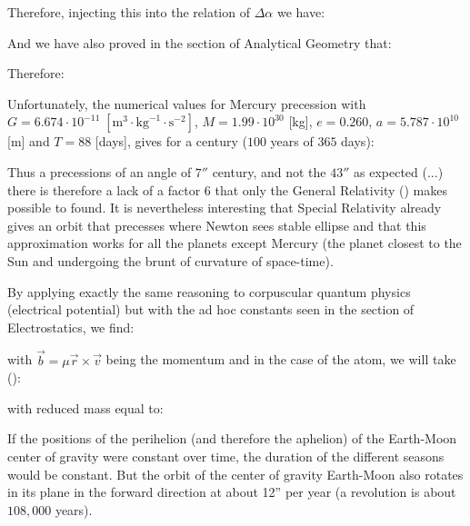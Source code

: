 	Therefore, injecting this into the relation of $\Delta \alpha$	we have:
	
	And we have also proved in the section of Analytical Geometry that:
	
	Therefore:
	
	Unfortunately, the numerical values for Mercury precession with $G=6.674\cdot 10^{-11}\;[\text{m}^3\cdot\text{kg}^{-1}\cdot \text{s}^{-2} ]$, $M=1.99\cdot 10^{30}$ [kg], $e=0.260$, $a=5.787\cdot 10^{10}$ [m] and $T=88$ [days], gives for a century ($100$ years of $365$ days):
	
	Thus a precessions of an angle of $7''$ century, and not the $43''$ as expected (...) there is therefore a lack of a factor $6$ that only the General Relativity () makes possible to found. It is nevertheless interesting that Special Relativity already gives an orbit that precesses where Newton sees stable ellipse and that this approximation works for all the planets except Mercury (the planet closest to the Sun and undergoing the brunt of curvature of space-time).
	\begin{tcolorbox}[title=Remark,colframe=black,arc=10pt]
	By applying exactly the same reasoning to corpuscular quantum physics (electrical potential) but with the ad hoc constants seen in the section of Electrostatics, we find:
	
	with $\vec{b}=\mu\vec{r}\times\vec{v}$ being the momentum and in the case of the atom, we will take ():
	
	with reduced mass equal to:
	
	\end{tcolorbox}
	If the positions of the perihelion (and therefore the aphelion) of the Earth-Moon center of gravity  were constant over time, the duration of the different seasons would be constant. But the orbit of the center of gravity Earth-Moon also rotates in its plane in the forward direction at about 12'' per year (a revolution is about $108,000$ years).

